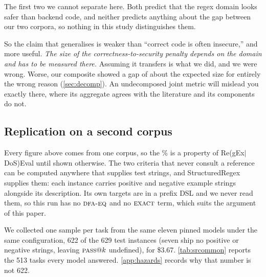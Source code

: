 \documentclass[11pt]{article}
\newcommand{\pass}{\textsc{pass}}
\newcommand{\dfaeq}{\textsc{dfa-eq}}
\newcommand{\exact}{\textsc{exact}}
\begin{document}
The first two we cannot separate here. Both predict that the regex domain
looks safer than backend code, and neither predicts anything about the gap
between our two corpora, so nothing in this study distinguishes them.

So the claim that generalises is weaker than ``correct code is often
insecure,'' and more useful. \emph{The size of the correctness-to-security
penalty depends on the domain and has to be measured there.} Assuming it
transfers is what we did, and we were wrong. Worse, our composite showed a gap
of about the expected size for entirely the wrong reason
(\cref{sec:decomp}). An undecomposed joint metric will mislead you exactly
there, where its aggregate agrees with the literature and its components do
not.

\subsection{Replication on a second corpus}
\label{sec:replication}

Every figure above comes from one corpus, so the \vulngivencorrect{}\% is a property of
Re(gEx$|$DoS)Eval until shown otherwise. The two criteria that never consult
a reference can be computed anywhere that supplies test strings, and
StructuredRegex~\citep{ye2020structuredregex} supplies them: each instance
carries positive and negative example strings alongside its description. Its
own targets are in a prefix DSL and we never read them, so this run has no
$\dfaeq{}$ and no $\exact{}$ term, which suits the argument of this paper.

We collected one sample per task from the same eleven pinned models under the
same configuration, 622 of the 629 test instances (seven ship no positive or
negative strings, leaving $\pass{}@k$ undefined), for \$3.67.
\cref{tab:srcommon} reports the 513 tasks every model answered.
\cref{app:hazards} records why that number is not 622.

\begin{table}[htbp]
\centering
\small

\caption{StructuredRegex, one sample per task, on the 513 instances answered
by all eleven models. Percentages. Intervals are Wilson binomial, which is
appropriate here in a way it is not in \cref{tab:main}: this is one sample per
task, so there is no within-task resampling for a bootstrap to exploit. The
last column is the share of functionally correct patterns that are
ReDoS-vulnerable, the same quantity this paper reports as
\vulngivencorrect{}\% on Re(gEx$|$DoS)Eval.}
\label{tab:srcommon}
\end{table}
\end{document}
